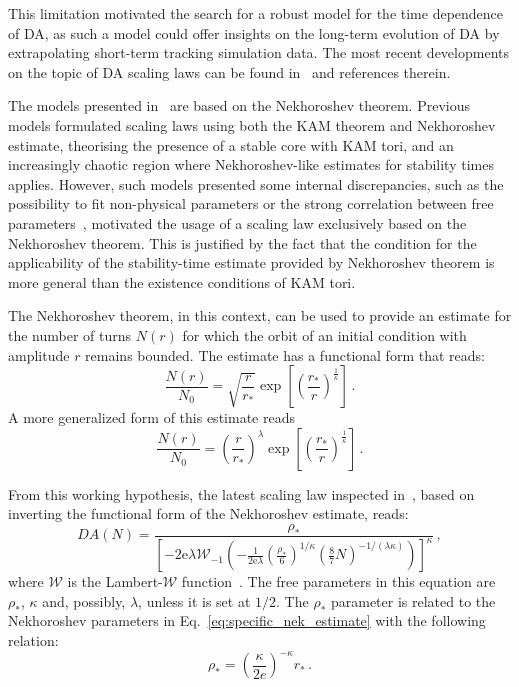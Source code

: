 This limitation motivated the search for a robust model for the time dependence of DA, as such a model could offer insights on the long-term evolution of DA by extrapolating short-term tracking simulation data. The most recent developments on the topic of DA scaling laws can be found in~\cite{Bazzani:2019csk} and references therein.

The models presented in~\cite{Bazzani:2019csk} are based on the Nekhoroshev theorem. Previous models formulated scaling laws using both the KAM theorem and Nekhoroshev estimate, theorising the presence of a stable core with KAM tori, and an increasingly chaotic region where Nekhoroshev-like estimates for stability times applies. However, such models presented some internal discrepancies, such as the possibility to fit non-physical parameters or the strong correlation between free parameters~\cite{Giovannozzi:2018wmm,Giovannozzi:2018igq}, motivated the usage of a scaling law exclusively based on the Nekhoroshev theorem. This is justified by the fact that the condition for the applicability of the stability-time estimate provided by Nekhoroshev theorem is more general than the existence conditions of KAM tori.

The Nekhoroshev theorem, in this context, can be used to provide an estimate for the number of turns $N(r)$ for which the orbit of an initial condition with amplitude $r$ remains bounded. The estimate has a functional form that reads:
\begin{equation}
    \frac{N(r)}{N_0} = \sqrt{\frac{r}{r_\ast}} \exp\left[\left(\frac{r_\ast}{r}\right)^{\frac{1}{\kappa}}\right]\,.
    \label{eq:specific_nek_estimate}
\end{equation}
A more generalized form of this estimate reads
\begin{equation}
    \frac{N(r)}{N_0} = \left(\frac{r}{r_\ast}\right)^{\lambda} \exp\left[\left(\frac{r_\ast}{r}\right)^{\frac{1}{\kappa}}\right]\,.
\end{equation}

From this working hypothesis, the latest scaling law inspected in~\cite{Bazzani:2019csk}, based on inverting the functional form of the Nekhoroshev estimate, reads:
\begin{equation}
	DA(N) = \frac{\rho_\ast}{\left[-2 \mathrm{e} \lambda \mathcal{W}_{-1}\left(-\frac{1}{2 \mathrm{e} \lambda}\left(\frac{\rho_*}{6}\right)^{1 / \kappa}\left(\frac{8}{7} N\right)^{-1 /(\lambda \kappa)}\right)\right]^\kappa}\,,
	\label{eq:giova_interpolation}
\end{equation}
where $\mathcal{W}$ is the Lambert-$\mathcal{W}$ function~\cite{Corless1996}. The free parameters in this equation are $\rho_\ast$, $\kappa$ and, possibly, $\lambda$, unless it is set at $1/2$. The $\rho_\ast$ parameter is related to the Nekhoroshev parameters in Eq.~\eqref{eq:specific_nek_estimate} with the following relation:
\begin{equation}
    \rho_\ast = \left(\frac{\kappa}{2e}\right)^{-\kappa} r_\ast \,.
\end{equation}

